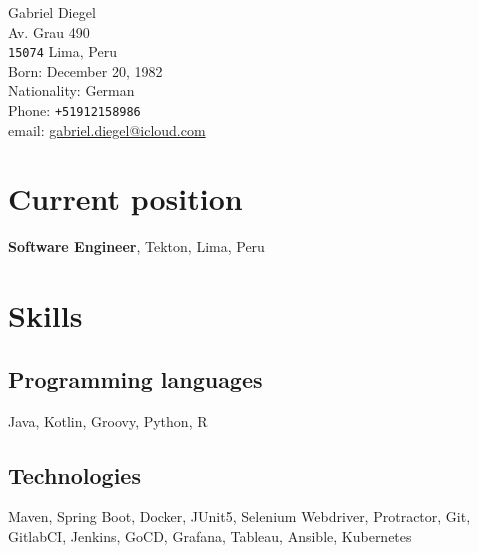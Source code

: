 \documentclass[10pt, a4paper]{article}
\begin{document}
{\LARGE Gabriel Diegel}\\[1cm]
Av. Grau 490\\
\texttt{15074} Lima, Peru\\[.2cm]
Born:  December 20, 1982\\
Nationality:  German\\[.2cm]
Phone: \texttt{+51912158986}\\
email: \href{mailto:gabriel.diegel@icloud.com}{gabriel.diegel@icloud.com}\\

\section*{Current position}
{\bf Software Engineer}, Tekton, Lima, Peru

\section*{Skills}
\subsection*{Programming languages}
Java, Kotlin, Groovy, Python, R
\subsection*{Technologies}
Maven, Spring Boot, Docker, JUnit5, Selenium Webdriver, Protractor, Git, GitlabCI, Jenkins, GoCD, Grafana, Tableau, Ansible, Kubernetes

\end{document}
